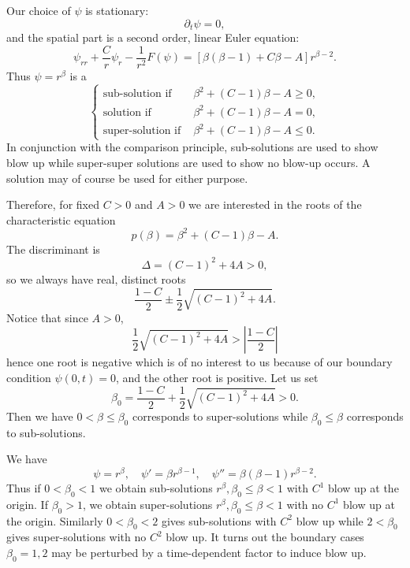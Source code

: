 \documentclass{amsart}
\begin{document}
Our choice of \(\psi\) is stationary:
\[
\partial_t \psi = 0,
\]
and the spatial part is a second order, linear Euler equation:
\[
\psi_{rr} + \frac{C}{r} \psi_r - \frac{1}{r^2} F(\psi) = \left[\beta(\beta-1) + C \beta - A\right]r^{\beta-2}.
\]
Thus \(\psi = r^{\beta}\) is a
\begin{equation}
\label{eq:betasubsuper}
\begin{cases}
\text{sub-solution if } & \beta^2 + (C - 1) \beta - A \geq 0, \\
\text{solution if } & \beta^2 + (C - 1) \beta - A = 0, \\
\text{super-solution if } & \beta^2 + (C - 1) \beta - A \leq 0.
\end{cases}
\end{equation}
In conjunction with the comparison principle, sub-solutions are used to show blow up while super-super solutions are used to show no blow-up occurs. A solution may of course be used for either purpose.

Therefore, for fixed \(C > 0\) and \(A > 0\) we are interested in the roots of the characteristic equation
\begin{equation}
\label{eq:char_poly}
p(\beta) = \beta^2 + (C - 1) \beta - A.
\end{equation}
The discriminant is
\[
\Delta = (C-1)^2 + 4 A > 0,
\]
so we always have real, distinct roots
\[
\frac{1 - C}{2} \pm \frac{1}{2} \sqrt{(C-1)^2 + 4 A}.
\]
Notice that since \(A > 0\),
\[
\frac{1}{2} \sqrt{(C-1)^2 + 4 A} > \left|\frac{1-C}{2}\right|
\]
hence one root is negative which is of no interest to us because of our boundary condition \(\psi(0, t) = 0\), and the other root is positive. Let us set
\[
\beta_0 = \frac{1 - C}{2} + \frac{1}{2} \sqrt{(C-1)^2 + 4 A} > 0.
\]
Then we have \(0 < \beta \leq \beta_0\) corresponds to super-solutions while \(\beta_0 \leq \beta\) corresponds to sub-solutions.

We have
\[
\psi = r^{\beta}, \quad \psi' = \beta r^{\beta-1}, \quad \psi'' = \beta(\beta-1) r^{\beta - 2}.
\]
Thus if \(0 < \beta_0 < 1\) we obtain sub-solutions \(r^{\beta}, \beta_0 \leq \beta < 1\) with \(C^1\) blow up at the origin. If \(\beta_0 > 1\), we obtain super-solutions \(r^{\beta}, \beta_0 \leq \beta < 1\) with no \(C^1\) blow up at the origin. Similarly \(0 < \beta_0 < 2\) gives sub-solutions with \(C^2\) blow up while \(2 < \beta_0\) gives super-solutions with no \(C^2\) blow up. It turns out the boundary cases \(\beta_0 = 1, 2\) may be perturbed by a time-dependent factor to induce blow up.
\end{document}
